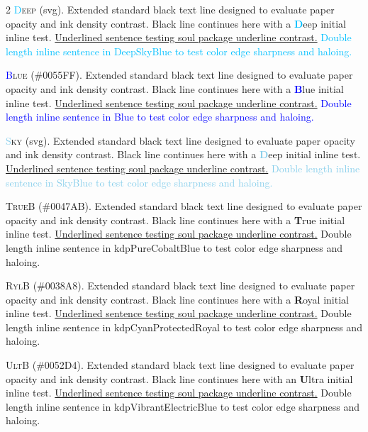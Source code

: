 \begin{multicols}{2}
\lettrine[lines=2]{\textcolor{DeepSkyBlue}{D}}{eep} (svg). Extended standard black text line designed to evaluate paper opacity and ink density contrast. Black line continues here with a \textbf{\textcolor{DeepSkyBlue}{D}}eep initial inline test. \ul{Underlined sentence testing soul package underline contrast.} \textcolor{DeepSkyBlue}{Double length inline sentence in DeepSkyBlue to test color edge sharpness and haloing.}


\lettrine[lines=2]{\textcolor{Blue}{B}}{lue} (\#0055FF). Extended standard black text line designed to evaluate paper opacity and ink density contrast. Black line continues here with a \textbf{\textcolor{Blue}{B}}lue initial inline test. \ul{Underlined sentence testing soul package underline contrast.} \textcolor{Blue}{Double length inline sentence in Blue to test color edge sharpness and haloing.}


\lettrine[lines=2]{\textcolor{SkyBlue}{S}}{ky} (svg). Extended standard black text line designed to evaluate paper opacity and ink density contrast. Black line continues here with a \textbf{\textcolor{SkyBlue}{D}}eep initial inline test. \ul{Underlined sentence testing soul package underline contrast.} \textcolor{SkyBlue}{Double length inline sentence in SkyBlue to test color edge sharpness and haloing.}


\lettrine[lines=2]{\textcolor{kdpPureCobaltBlue}{T}}{rueB} (\#0047AB). Extended standard black text line designed to evaluate paper opacity and ink density contrast. Black line continues here with a \textbf{\textcolor{kdpPureCobaltBlue}{T}}rue initial inline test. \ul{Underlined sentence testing soul package underline contrast.} \textcolor{kdpPureCobaltBlue}{Double length inline sentence in kdpPureCobaltBlue to test color edge sharpness and haloing.}


\lettrine[lines=2]{\textcolor{kdpCyanProtectedRoyal}{R}}{ylB} (\#0038A8). Extended standard black text line designed to evaluate paper opacity and ink density contrast. Black line continues here with a \textbf{\textcolor{kdpCyanProtectedRoyal}{R}}oyal initial inline test. \ul{Underlined sentence testing soul package underline contrast.} \textcolor{kdpCyanProtectedRoyal}{Double length inline sentence in kdpCyanProtectedRoyal to test color edge sharpness and haloing.}


\lettrine[lines=2]{\textcolor{kdpVibrantElectricBlue}{U}}{ltB} (\#0052D4). Extended standard black text line designed to evaluate paper opacity and ink density contrast. Black line continues here with an \textbf{\textcolor{kdpVibrantElectricBlue}{U}}ltra initial inline test. \ul{Underlined sentence testing soul package underline contrast.} \textcolor{kdpVibrantElectricBlue}{Double length inline sentence in kdpVibrantElectricBlue to test color edge sharpness and haloing.}



\end{multicols}
